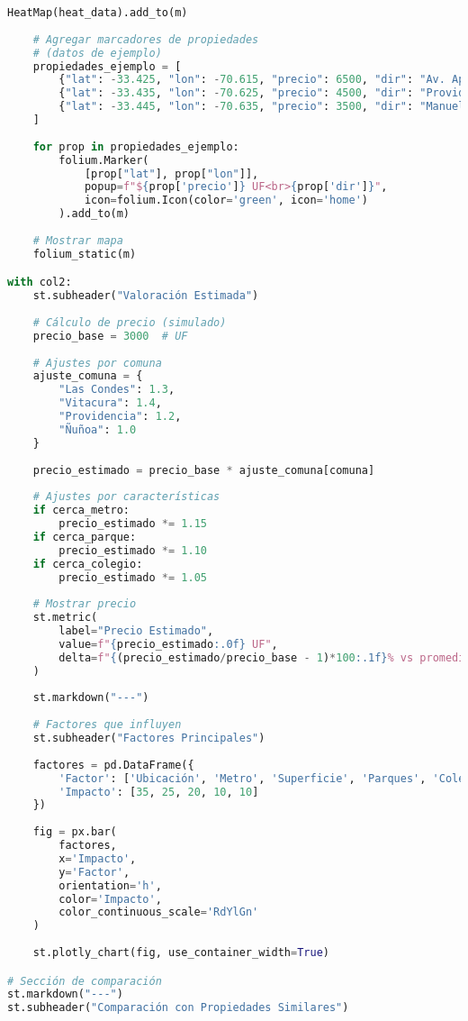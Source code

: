 \documentclass[11pt,a4paper]{article}
\begin{document}
\begin{lstlisting}[language=Python]
    HeatMap(heat_data).add_to(m)
    
    # Agregar marcadores de propiedades
    # (datos de ejemplo)
    propiedades_ejemplo = [
        {"lat": -33.425, "lon": -70.615, "precio": 6500, "dir": "Av. Apoquindo 3000"},
        {"lat": -33.435, "lon": -70.625, "precio": 4500, "dir": "Providencia 1234"},
        {"lat": -33.445, "lon": -70.635, "precio": 3500, "dir": "Manuel Montt 567"},
    ]
    
    for prop in propiedades_ejemplo:
        folium.Marker(
            [prop["lat"], prop["lon"]],
            popup=f"${prop['precio']} UF<br>{prop['dir']}",
            icon=folium.Icon(color='green', icon='home')
        ).add_to(m)
    
    # Mostrar mapa
    folium_static(m)

with col2:
    st.subheader("Valoración Estimada")
    
    # Cálculo de precio (simulado)
    precio_base = 3000  # UF
    
    # Ajustes por comuna
    ajuste_comuna = {
        "Las Condes": 1.3,
        "Vitacura": 1.4,
        "Providencia": 1.2,
        "Ñuñoa": 1.0
    }
    
    precio_estimado = precio_base * ajuste_comuna[comuna]
    
    # Ajustes por características
    if cerca_metro:
        precio_estimado *= 1.15
    if cerca_parque:
        precio_estimado *= 1.10
    if cerca_colegio:
        precio_estimado *= 1.05
    
    # Mostrar precio
    st.metric(
        label="Precio Estimado",
        value=f"{precio_estimado:.0f} UF",
        delta=f"{(precio_estimado/precio_base - 1)*100:.1f}% vs promedio"
    )
    
    st.markdown("---")
    
    # Factores que influyen
    st.subheader("Factores Principales")
    
    factores = pd.DataFrame({
        'Factor': ['Ubicación', 'Metro', 'Superficie', 'Parques', 'Colegios'],
        'Impacto': [35, 25, 20, 10, 10]
    })
    
    fig = px.bar(
        factores,
        x='Impacto',
        y='Factor',
        orientation='h',
        color='Impacto',
        color_continuous_scale='RdYlGn'
    )
    
    st.plotly_chart(fig, use_container_width=True)

# Sección de comparación
st.markdown("---")
st.subheader("Comparación con Propiedades Similares")


\end{lstlisting}
\end{document}
